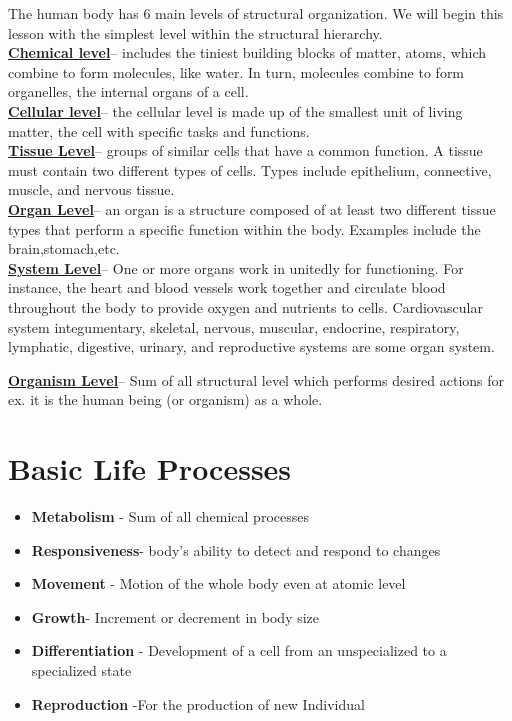 \documentclass[12pts]{article}
\begin{document}
\begin{flushleft}
The human body has 6 main levels of structural organization. We will begin this lesson with the simplest level within the structural hierarchy.\\

\textbf{\underline{Chemical level}}– includes the tiniest building blocks of matter, atoms, which combine to form molecules, like water. In turn, molecules combine to form organelles, the internal organs of a cell.\\
\textbf{\underline{Cellular level}}– the cellular level is made up of the smallest unit of living matter, the cell with specific tasks and functions.\\

\textbf{\underline{Tissue Level}}– groups of similar cells that have a common function. A tissue must contain two different types of cells. Types include epithelium, connective, muscle, and nervous tissue.\\ 

\textbf{\underline{Organ Level}}– an organ is a structure composed of at least two different tissue types that perform a specific function within the body. Examples include the brain,stomach,etc.\\

\textbf{\underline{System Level}}– One or more organs work in unitedly for functioning. For instance, the heart and blood vessels work together and circulate blood throughout the body to provide oxygen and nutrients to cells. Cardiovascular system integumentary, skeletal, nervous, muscular, endocrine, respiratory, lymphatic, digestive, urinary, and reproductive systems are some organ system.

\textbf{\underline{Organism Level}}– Sum of all structural level which performs desired actions for ex. it is the human being (or organism) as a whole.
\end{flushleft}

\section*{Basic Life Processes}
\begin{flushleft}
\begin{itemize}
\item \textbf{Metabolism} - Sum of all chemical processes
\item \textbf{Responsiveness}- body’s ability to detect and respond to 
changes
\item \textbf{Movement} - Motion of the whole body even at atomic level
\item \textbf{Growth}- Increment or decrement in body size
\item \textbf{Differentiation} - Development of a cell 
from an unspecialized to a specialized state
\item \textbf{Reproduction} -For the production of new Individual
\end{itemize}
\end{flushleft}
\end{document}
